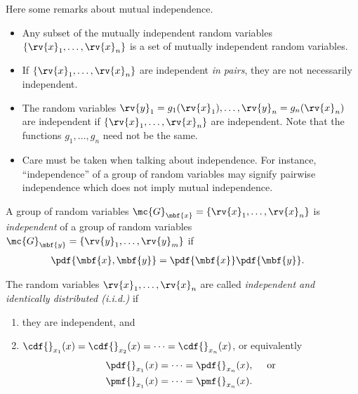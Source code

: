 \begin{remark}
    Here some remarks about mutual independence.
    \begin{itemize}
        \item Any subset of the mutually independent random variables $\left\{ \rv{x}_{1}, \ldots, \rv{x}_{n}\right\}$ is a set of mutually independent random variables. 
        \item If $\left\{ \rv{x}_{1},\ldots, \rv{x}_{n}\right\}$ are independent \emph{in pairs}, they are not necessarily independent.
        \item The random variables $\rv{y}_{1}=g_{1}(\rv{x}_{1}),\ldots,\rv{y}_{n}=g_{n}(\rv{x}_{n})$ are independent if $\left\{ \rv{x}_{1},\ldots, \rv{x}_{n}\right\}$ are independent. Note that the functions $g_{1}, \ldots, g_{n}$ need not be the same.
        \item Care must be taken when talking about independence. For instance, ``independence'' of a group of random variables may signify pairwise independence which does not imply mutual independence.
    \end{itemize}
\end{remark}

\begin{mydefinition}
    A group of random variables $\mc{G}_{\mbf{x}} = \left\{ \rv{x}_{1}, \ldots,\rv{x}_{n}\right\}$ is \emph{independent} of a group of random variables $\mc{G}_{\mbf{y}} = \left\{ \rv{y}_{1}, \ldots,\rv{y}_{m}\right\}$ if 
    \begin{align}
        \pdf{\mbf{x},\mbf{y}} &= \pdf{\mbf{x}}\pdf{\mbf{y}}.
    \end{align}
\end{mydefinition}

\begin{mydefinition}
    The random variables $\rv{x}_{1}, \ldots, \rv{x}_{n}$ are called \emph{independent and identically distributed (i.i.d.)} if 
    \begin{enumerate}
        \item they are independent, and
        \item $\cdf{}_{x_{1}}(x) = \cdf{}_{x_{2}}(x) = \cdots = \cdf{}_{x_{n}}(x)$, or equivalently
        \begin{align}
            \pdf{}_{x_{1}}(x) &= \cdots = \pdf{}_{x_{n}}(x), \quad \text{ or}\\
            \pmf{}_{x_{1}}(x) &= \cdots = \pmf{}_{x_{n}}(x).           
        \end{align}
    \end{enumerate}
\end{mydefinition}

